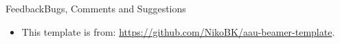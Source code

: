 \begin{frame}{Feedback}{Bugs, Comments and Suggestions}
  \begin{itemize}
    \item<1-> This template is from: \url{https://github.com/NikoBK/aau-beamer-template}.
  \end{itemize}
\end{frame}